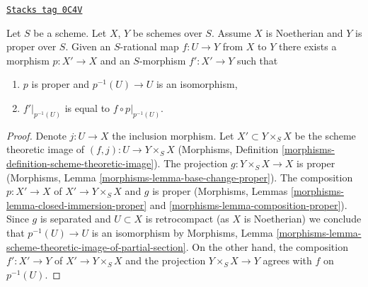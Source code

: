 \begin{lemma}
\label{divisors-lemma-extend-rational-map-after-modification}
\href{https://stacks.math.columbia.edu/tag/0C4V}{\texttt{Stacks tag 0C4V}}

Let $S$ be a scheme. Let $X$, $Y$ be schemes over $S$.
Assume $X$ is Noetherian and $Y$ is proper over $S$.
Given an $S$-rational map $f : U \to Y$ from $X$ to $Y$
there exists a morphism $p : X' \to X$ and an
$S$-morphism $f' : X' \to Y$ such that
\begin{enumerate}
\item $p$ is proper and $p^{-1}(U) \to U$ is an isomorphism,
\item $f'|_{p^{-1}(U)}$ is equal to $f \circ p|_{p^{-1}(U)}$.
\end{enumerate}
\end{lemma}

\begin{proof}
Denote $j : U \to X$ the inclusion morphism. Let $X' \subset Y \times_S X$
be the scheme theoretic image of $(f, j) : U \to Y \times_S X$
(Morphisms, Definition \ref{morphisms-definition-scheme-theoretic-image}).
The projection $g : Y \times_S X \to X$ is proper
(Morphisms, Lemma \ref{morphisms-lemma-base-change-proper}).
The composition $p : X' \to X$ of $X' \to Y \times_S X$ and $g$ is proper
(Morphisms, Lemmas \ref{morphisms-lemma-closed-immersion-proper} and
\ref{morphisms-lemma-composition-proper}).
Since $g$ is separated and $U \subset X$ is retrocompact (as $X$ is Noetherian)
we conclude that $p^{-1}(U) \to U$ is an isomorphism by
Morphisms, Lemma
\ref{morphisms-lemma-scheme-theoretic-image-of-partial-section}.
On the other hand, the composition $f' : X' \to Y$ of $X' \to Y \times_S X$
and the projection $Y \times_S X \to Y$ agrees with $f$ on $p^{-1}(U)$.
\end{proof}



